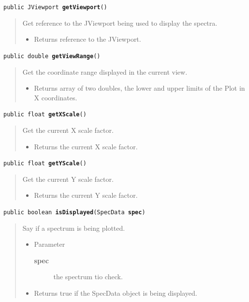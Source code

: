 \documentclass[twoside,11pt]{article}
\renewcommand{\_}{\texttt{\symbol{95}}}
\newcommand{\method}[1]{\texttt{#1}}
\newenvironment{desc}{\begin{quote}}{\end{quote}}
\begin{document}
\method{public JViewport \textbf{getViewport}()\label{l176}\label{l177}}
\begin{desc}Get reference to the JViewport being used to display the
 spectra.
\begin{itemize}
\item{Returns reference to the JViewport. }
\end{itemize}
\end{desc}

\method{public double \textbf{getViewRange}()\label{l178}\label{l179}}
\begin{desc}Get the coordinate range displayed in the current view.
\begin{itemize}
\item{Returns array of two doubles, the lower and upper limits of the
        Plot in X coordinates. }
\end{itemize}
\end{desc}

\method{public float \textbf{getXScale}()\label{l180}\label{l181}}
\begin{desc}Get the current X scale factor.
\begin{itemize}
\item{Returns the current X scale factor. }
\end{itemize}
\end{desc}

\method{public float \textbf{getYScale}()\label{l182}\label{l183}}
\begin{desc}Get the current Y scale factor.
\begin{itemize}
\item{Returns the current Y scale factor. }
\end{itemize}
\end{desc}

\method{public boolean \textbf{isDisplayed}(\texttt{SpecData} \textbf{spec})\label{l184}\label{l185}}
\begin{desc}Say if a spectrum is being plotted.
\begin{itemize}
\item{Parameter
  \begin{description}
   \item[\textbf{spec}]{the spectrum tio check.}
  \end{description}}
\end{itemize}
\begin{itemize}
\item{Returns true if the SpecData object is being displayed. }
\end{itemize}
\end{desc}
\end{document}
